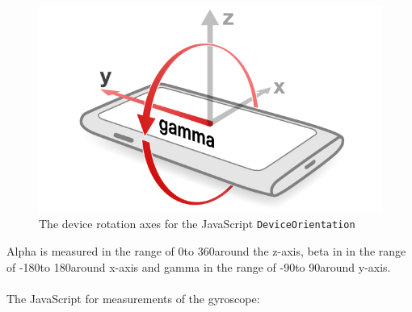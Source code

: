 \begin{figure}[H]
\begin{minipage}[c]{.23\textwidth}
  \end{minipage}
  \hspace{1cm}
  \begin{minipage}[c]{.23\textwidth}
    \centering
    \includegraphics[scale=0.2]{img/device-gamma}
    \hspace{1cm}
  \end{minipage}
  \caption{The device rotation axes for the JavaScript \texttt{DeviceOrientation}}
  \label{fig:device-rot}
\end{figure}
Alpha is measured in the range of 0\degree to 360\degree around the z-axis, beta in in the range of -180\degree to 180\degree around x-axis and gamma in the range of -90\degree to 90\degree around y-axis.\\
\\
The JavaScript for measurements of the gyroscope:

\cite[]{sensor:W3C}
